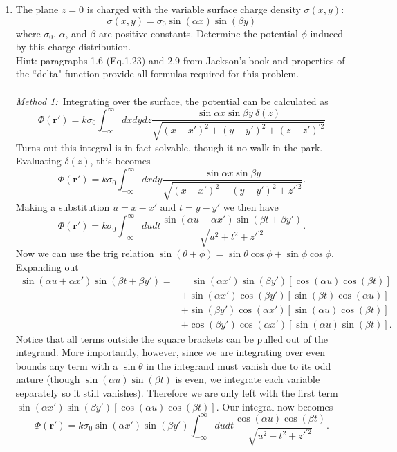 \documentclass[11pt,letterpaper]{article}
\newcommand{\vect}[1]{\mathbf{#1}}
\begin{document}
\begin{enumerate}
  \item The plane $z=0$ is charged with the variable surface charge density $\sigma(x,y)$:
  $$\sigma(x,y) = \sigma_0\sin(\alpha x)\sin(\beta y)$$
  where $\sigma_0$, $\alpha$, and $\beta$ are positive constants. Determine the potential $\phi$ induced by this charge distribution.\\Hint: paragraphs 1.6 (Eq.1.23) and 2.9 from Jackson's book and properties of the ``delta"-function provide all formulas required for this problem.
\\ \\\emph{Method 1:}\ Integrating over the surface, the potential can be calculated as
  $$\Phi(\vect r')=k\sigma_0\int_{-\infty}^{\infty}{dxdydz\frac{\sin{\alpha x}\sin{\beta y}\ \delta(z)}{\sqrt{(x-x')^2+(y-y')^2 + (z-z')^{'2}}}}$$
Turns out this integral is in fact solvable, though it no walk in the park. Evaluating $\delta(z)$, this becomes
  $$\Phi(\vect r')=k\sigma_0\int_{-\infty}^{\infty}{dxdy\frac{\sin{\alpha x}\sin{\beta y}}{\sqrt{(x-x')^2+(y-y')^2 + z'^{'2}}}}.$$
  Making a substitution $u = x-x'$ and $t = y-y'$ we then have
  $$\Phi(\vect r')=k\sigma_0\int_{-\infty}^{\infty}{dudt\frac{\sin{(\alpha u +\alpha x')}\sin{(\beta t+\beta y')}}{\sqrt{u^2+t^2 + z'^{'2}}}}.$$
  Now we can use the trig relation $\sin{(\theta+\phi)} = \sin\theta\cos\phi+\sin\phi\cos\phi$. Expanding out 
 \begin{align*}\sin{(\alpha u +\alpha x')}\sin{(\beta t+\beta y')} =& \quad\sin{(\alpha x')}\sin{(\beta y')}[\cos{(\alpha u)}\cos{(\beta t)}]\\&+\sin{(\alpha x')}\cos{(\beta y')}[\sin{(\beta t)}\cos{(\alpha u)}]\\&+\sin{(\beta y')}\cos{(\alpha x')}[\sin{(\alpha u)}\cos{(\beta t)}]\\&+\cos{(\beta y')}\cos{(\alpha x')}[\sin{(\alpha u)}\sin{(\beta t)}].
 \end{align*}
 Notice that all terms outside the square brackets can be pulled out of the integrand. More importantly, however, since we are integrating over even bounds any term with a $\sin\theta$ in the integrand must vanish due to its odd nature (though $\sin{(\alpha u)}\sin{(\beta t)}$ is even, we integrate each variable separately so it still vanishes). Therefore we are only left with the first term $\sin{(\alpha x')}\sin{(\beta y')}[\cos{(\alpha u)}\cos{(\beta t)}]$. Our integral now becomes
 $$\Phi(\vect r')=k\sigma_0\sin{(\alpha x')}\sin{(\beta y')}\int_{-\infty}^{\infty}{dudt\frac{\cos{(\alpha u)}\cos{(\beta t)}}{\sqrt{u^2+t^2 + z'^{'2}}}}.$$

\end{enumerate}
\end{document}
